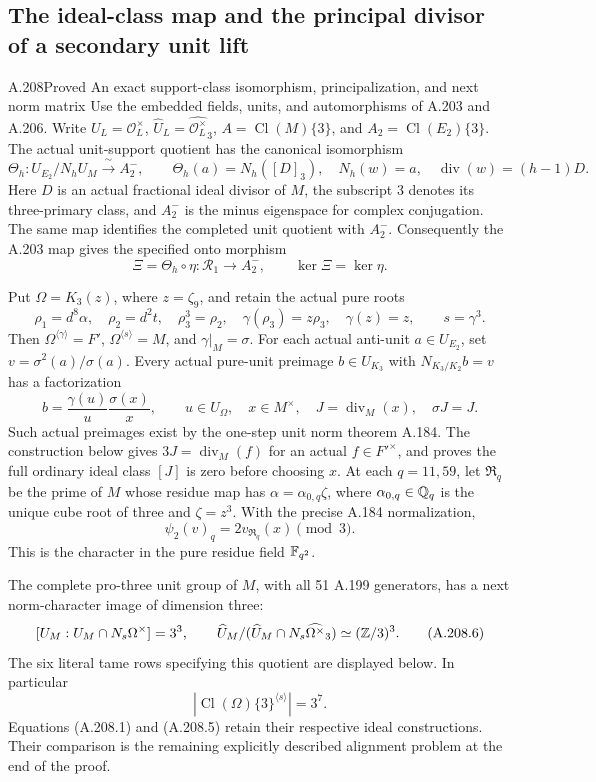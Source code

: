 \subsection{The ideal-class map and the principal divisor of a secondary unit lift}

\begin{statement}{A.208}{Proved}
{An exact support-class isomorphism, principalization, and next norm matrix}
Use the embedded fields, units, and automorphisms of A.203 and A.206.
Write \(U_L=\mathcal O_L^\times\),
\(\widehat U_L=\widehat{\mathcal O_L^\times}_3\),
\(A=\operatorname{Cl}(M)\{3\}\), and
\(A_2=\operatorname{Cl}(E_2)\{3\}\).
The actual unit-support quotient has the canonical isomorphism
\[
 \Theta_h:U_{E_2}/N_hU_M
       \xrightarrow{\ \sim\ }A_2^-,\qquad
 \Theta_h(a)=N_h([D]_3),\quad
 N_h(w)=a,\quad \operatorname{div}(w)=(h-1)D.
\tag{A.208.1}
\]
Here \(D\) is an actual fractional ideal divisor of \(M\),
the subscript \(3\) denotes its three-primary class, and
\(A_2^-\) is the minus eigenspace for complex conjugation.
The same map identifies the completed unit quotient with \(A_2^-\).
Consequently the A.203 map gives the specified onto morphism
\[
 \Xi=\Theta_h\circ\eta:\mathcal R_1\longrightarrow A_2^-,
 \qquad
 \ker\Xi=\ker\eta.
\tag{A.208.2}
\]

Put \(\Omega=K_3(z)\), where \(z=\zeta_9\), and retain
the actual pure roots
\[
 \rho_1=d^8\alpha,\quad \rho_2=d^2t,\quad
 \rho_3^3=\rho_2,\quad
 \gamma(\rho_3)=z\rho_3,\quad \gamma(z)=z,
 \qquad s=\gamma^3.
\tag{A.208.3}
\]
Then \(\Omega^{\langle\gamma\rangle}=F'\),
\(\Omega^{\langle s\rangle}=M\), and \(\gamma|_M=\sigma\).
For each actual anti-unit \(a\in U_{E_2}\), set
\(v=\sigma^2(a)/\sigma(a)\).  Every actual pure-unit preimage
\(b\in U_{K_3}\) with \(N_{K_3/K_2}b=v\) has a factorization
\[
 b=\frac{\gamma(u)}u\frac{\sigma(x)}x,
 \qquad u\in U_\Omega,\quad x\in M^\times,\quad
 J=\operatorname{div}_M(x),\quad \sigma J=J.
\tag{A.208.4}
\]
Such actual preimages exist by the one-step unit norm theorem A.184.
The construction below gives \(3J=\operatorname{div}_M(f)\)
for an actual \(f\in F'^\times\), and proves the full ordinary
ideal class \([J]\) is zero before choosing \(x\).
At each \(q=11,59\), let \(\mathfrak R_q\) be the prime of
\(M\) whose residue map has \(\alpha=\alpha_{0,q}\zeta\),
where \(\alpha_{0,q}\in\mathbb Q_q\) is the unique cube root of three
and \(\zeta=z^3\).  With the precise A.184 normalization,
\[
 \psi_2(v)_q=2v_{\mathfrak R_q}(x)\pmod3.
\tag{A.208.5}
\]
This is the character in the pure residue field \(\mathbb F_{q^2}\).

The complete pro-three unit group of \(M\), with all 51 A.199
generators, has a next norm-character image of dimension three:
\[
 [U_M:U_M\cap N_s\Omega^\times]=3^3,
 \qquad
 \widehat U_M/
   (\widehat U_M\cap N_s\widehat{\Omega^\times}_3)
       \simeq(\mathbb Z/3)^3.
\tag{A.208.6}
\]
The six literal tame rows specifying this quotient are displayed
below.  In particular
\[
       |\operatorname{Cl}(\Omega)\{3\}^{\langle s\rangle}|
                  =3^7.
\tag{A.208.7}
\]
Equations (A.208.1) and (A.208.5) retain their respective ideal
constructions.  Their comparison is the remaining explicitly
described alignment problem at the end of the proof.
\end{statement}

